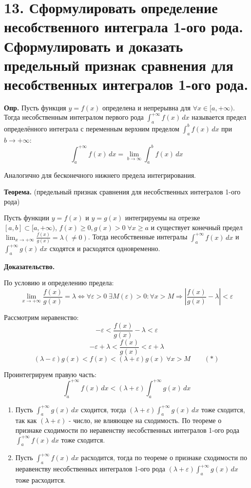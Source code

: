 \documentclass[11pt]{article}
\begin{document}
\section*{13. Сформулировать определение несобственного интеграла 1-ого рода. Сформулировать и доказать предельный признак сравнения для несобственных интегралов 1-ого рода.}
\par\textbf{Опр.} Пусть функция $y = f(x)$ определена и непрерывна для $\forall x \in [a, +\infty)$. Тогда несобственным интегралом первого рода $\int_{a}^{+\infty} f(x) \, dx$ называется предел определённого интеграла с переменным верхним пределом $\int_{a}^{b} f(x) \, dx$ при $b \to +\infty$:$$\int_{a}^{+\infty} f(x) \, dx = \lim_{ b \to \infty}{\int_{a}^b f(x) \, dx }$$
\par Аналогично для бесконечного нижнего предела интегрирования.
\par\textbf{Теорема.} (предельный признак сравнения для несобственных интегралов 1-ого рода)
\par Пусть функции $y = f(x)$ и $y = g(x)$ интегрируемы на отрезке $[a, b] \subset [a, +\infty)$, $f(x) \geq 0, g(x) > 0 \; \forall x \geq a$ и существует конечный предел $\lim_{ x \to +\infty }{\frac{f(x)}{g(x)}} = \lambda (\not = 0)$. Тогда несобственные интегралы $\int_{a}^{+\infty} f(x) \, dx$ и $\int_{a}^{+\infty} g(x) \, dx$ сходятся и расходятся одновременно.
\par\textbf{Доказательство.}
\par По условию и определению предела:$$\lim_{ x \to +\infty }{\frac{f(x)}{g(x)}} = \lambda \iff \forall \varepsilon > 0 \; \exists M(\varepsilon) > 0: \forall x > M \Rightarrow \left| \frac{f(x)}{g(x)} - \lambda \right| < \varepsilon$$
\par Рассмотрим неравенство:
$$- \varepsilon < \frac{f(x)}{g(x)} - \lambda < \varepsilon$$
$$- \varepsilon + \lambda < \frac{f(x)}{g(x)} < \varepsilon + \lambda$$
$$(\lambda - \varepsilon) g(x) < f(x) < (\lambda + \varepsilon) g(x) \; \forall x > M \qquad (*)$$
\par Проинтегрируем правую часть:$$\int_{a}^{+\infty} f(x) \, dx < (\lambda + \varepsilon) \int_{a}^{+\infty} g(x) \, dx$$
\begin{enumerate}
\item Пусть $\int_{a}^{+\infty} g(x) \, dx$ сходится, тогда $(\lambda + \varepsilon) \int_{a}^{+\infty} g(x) \, dx$ тоже сходится, так как $(\lambda + \varepsilon)$ - число, не влияющее на сходимость. По теореме о признаке сходимости по неравенству несобственных интегралов 1-ого рода $\int_{a}^{+\infty} f(x) \, dx$ тоже сходится.
\item Пусть $\int_{a}^{+\infty} f(x) \, dx$ расходится, тогда по теореме о признаке сходимости по неравенству несобственных интегралов 1-ого рода $(\lambda + \varepsilon) \int_{a}^{+\infty} g(x) \, dx$ тоже расходится.
\end{enumerate}
\end{document}
